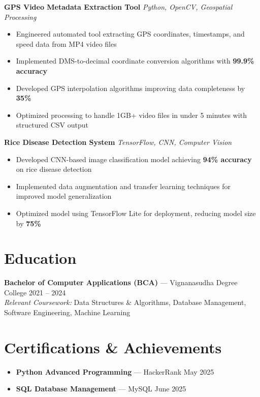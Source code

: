 \documentclass[letterpaper,10.5pt]{article}
\begin{document}
\textbf{GPS Video Metadata Extraction Tool} \hfill \textit{Python, OpenCV, Geospatial Processing}
\begin{itemize}
\item Engineered automated tool extracting GPS coordinates, timestamps, and speed data from MP4 video files
\item Implemented DMS-to-decimal coordinate conversion algorithms with \textbf{99.9\% accuracy}
\item Developed GPS interpolation algorithms improving data completeness by \textbf{35\%}
\item Optimized processing to handle 1GB+ video files in under 5 minutes with structured CSV output
\end{itemize}

\textbf{Rice Disease Detection System} \hfill \textit{TensorFlow, CNN, Computer Vision}
\begin{itemize}
\item Developed CNN-based image classification model achieving \textbf{94\% accuracy} on rice disease detection
\item Implemented data augmentation and transfer learning techniques for improved model generalization
\item Optimized model using TensorFlow Lite for deployment, reducing model size by \textbf{75\%}
\end{itemize}

\section{Education}
\textbf{Bachelor of Computer Applications (BCA)} — Vignanasudha Degree College \hfill 2021 – 2024 \\
\textit{Relevant Coursework:} Data Structures \& Algorithms, Database Management, Software Engineering, Machine Learning

\section{Certifications \& Achievements}
\begin{itemize}
    \item \textbf{Python Advanced Programming} — HackerRank \hfill May 2025
    \item \textbf{SQL Database Management} — MySQL \hfill June 2025
\end{itemize}
\end{document}

